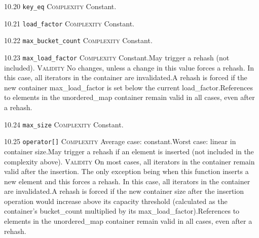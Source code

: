\noindent\textcolor{cgreen}{10.20 \texttt{key\_eq}} \textsc{Complexity} Constant. \vspace{0.5em}

\noindent\textcolor{cgreen}{10.21 \texttt{load\_factor}} \textsc{Complexity} Constant. \vspace{0.5em}

\noindent\textcolor{cgreen}{10.22 \texttt{max\_bucket\_count}} \textsc{Complexity} Constant. \vspace{0.5em}

\noindent\textcolor{cgreen}{10.23 \texttt{max\_load\_factor}} \textsc{Complexity} Constant.May trigger a rehash (not included). \textsc{Validity} No changes, unless a change in this value forces a rehash. In this case, all iterators in the container are invalidated.A rehash is forced if the new container max\_load\_factor is set below the current load\_factor.References to elements in the unordered\_map container remain valid in all cases, even after a rehash.\vspace{0.5em}

\noindent\textcolor{cgreen}{10.24 \texttt{max\_size}} \textsc{Complexity} Constant. \vspace{0.5em}

\noindent\textcolor{corange}{10.25 \texttt{operator[]}} \textsc{Complexity} Average case: constant.Worst case: linear in container size.May trigger a rehash if an element is inserted (not included in the complexity above). \textsc{Validity} On most cases, all iterators in the container remain valid after the insertion. The only exception being when this function inserts a new element and this forces a rehash. In this case, all iterators in the container are invalidated.A rehash is forced if the new container size after the insertion operation would increase above its capacity threshold (calculated as the container's bucket\_count multiplied by its max\_load\_factor).References to elements in the unordered\_map container remain valid in all cases, even after a rehash.\vspace{0.5em}


